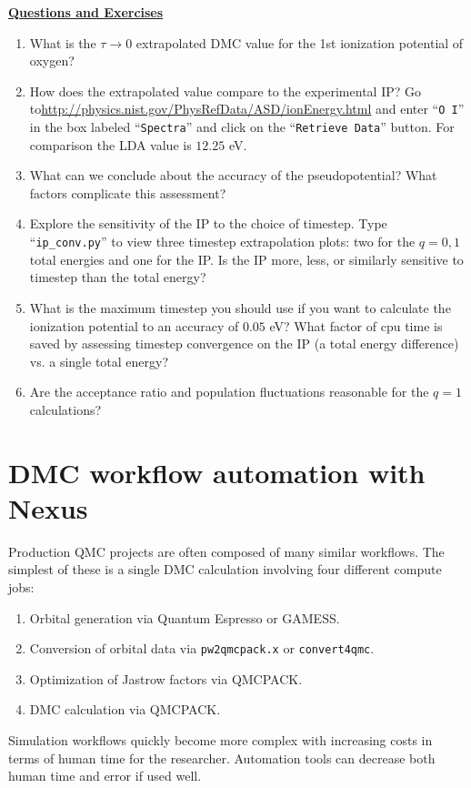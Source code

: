 \vspace{1cm}
\begin{flushleft}
\textbf{\underline{Questions and Exercises}}
\end{flushleft}
\begin{enumerate}
  \item{What is the $\tau\rightarrow 0$ extrapolated DMC value for the 1st ionization potential of oxygen?}
  \item{How does the extrapolated value compare to the experimental IP?  Go to\newline \href{http://physics.nist.gov/PhysRefData/ASD/ionEnergy.html}{http://physics.nist.gov/PhysRefData/ASD/ionEnergy.html} and enter ``\texttt{O I}'' in the box labeled ``\texttt{Spectra}'' and click on the ``\texttt{Retrieve Data}'' button.  For comparison the LDA value is $12.25$ eV.}
  \item{What can we conclude about the accuracy of the pseudopotential?  What factors complicate this assessment?}
  \item{Explore the sensitivity of the IP to the choice of timestep.  Type ``\texttt{ip\_conv.py}'' to view three timestep extrapolation plots: two for the $q=0,1$ total energies and one for the IP.  Is the IP more, less, or similarly sensitive to timestep than the total energy?}
  \item{What is the maximum timestep you should use if you want to calculate the ionization potential to an accuracy of $0.05$ eV?  What factor of cpu time is saved by assessing timestep convergence on the IP (a total energy difference) vs. a single total energy?}
  \item{Are the acceptance ratio and population fluctuations reasonable for the $q=1$ calculations?}
\end{enumerate}




\section{DMC workflow automation with Nexus}
Production QMC projects are often composed of many similar workflows.  The simplest of these is a single DMC calculation involving four different compute jobs:
\begin{enumerate}
  \item{Orbital generation via Quantum Espresso or GAMESS.}
  \item{Conversion of orbital data via \texttt{pw2qmcpack.x} or \texttt{convert4qmc}.}
  \item{Optimization of Jastrow factors via QMCPACK.}
  \item{DMC calculation via QMCPACK.}
\end{enumerate}
Simulation workflows quickly become more complex with increasing costs in terms of human time for the researcher.  Automation tools can decrease both human time and error if used well.

